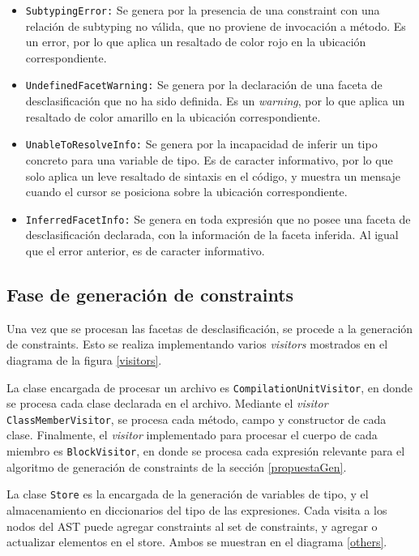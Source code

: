 \begin{itemize}
  \item \texttt{SubtypingError:} Se genera por la presencia de una constraint con una relación de subtyping no válida, que no proviene de invocación a método. Es un error, por lo que aplica un resaltado de color rojo en la ubicación correspondiente.
  \item \texttt{UndefinedFacetWarning:} Se genera por la declaración de una faceta de desclasificación que no ha sido definida. Es un \textit{warning}, por lo que aplica un resaltado de color amarillo en la ubicación correspondiente.
  \item \texttt{UnableToResolveInfo:} Se genera por la incapacidad de inferir un tipo concreto para una variable de tipo. Es de caracter informativo, por lo que solo aplica un leve resaltado de sintaxis en el código, y muestra un mensaje cuando el cursor se posiciona sobre la ubicación correspondiente.
  \item \texttt{InferredFacetInfo:} Se genera en toda expresión que no posee una faceta de desclasificación declarada, con la información de la faceta inferida. Al igual que el error anterior, es de caracter informativo.
\end{itemize}

\subsection{Fase de generación de constraints}
Una vez que se procesan las facetas de desclasificación, se procede a la generación de constraints. Esto se realiza implementando varios \textit{visitors} mostrados en el diagrama de la figura \ref{visitors}.

La clase encargada de procesar un archivo es \texttt{CompilationUnitVisitor}, en donde se procesa cada clase declarada en el archivo. Mediante el \textit{visitor} \texttt{ClassMemberVisitor}, se procesa cada método, campo y constructor de cada clase. Finalmente, el \textit{visitor} implementado para procesar el cuerpo de cada miembro es \texttt{BlockVisitor}, en donde se procesa cada expresión relevante para el algoritmo de generación de constraints de la sección \ref{propuestaGen}.

La clase \texttt{Store} es la encargada de la generación de variables de tipo, y el almacenamiento en diccionarios del tipo de las expresiones. Cada visita a los nodos del AST puede agregar constraints al set de constraints, y agregar o actualizar elementos en el store. Ambos se muestran en el diagrama \ref{others}.

